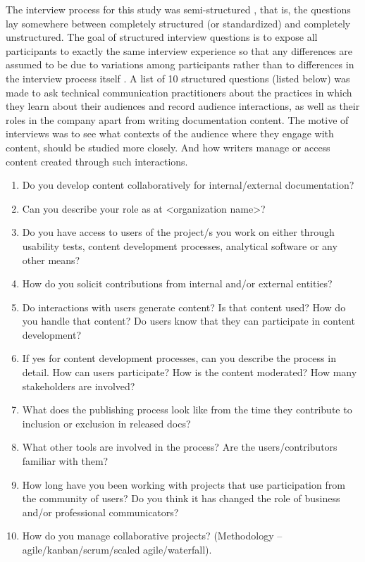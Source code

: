 The interview process for this study was semi-structured \cite{dicicco2006qualitative, knox2009qualitative, glaser2017discovery}, that is, the questions lay somewhere between completely structured (or standardized) and completely unstructured. The goal of structured interview questions is to expose all participants to exactly the same interview experience \cite{fontana2005interview} so that any differences are assumed to be due to variations among participants rather than to differences in the interview process itself \cite{fontana2005interview}. A list of 10 structured questions (listed below) was made to ask technical communication practitioners about the practices in which they learn about their audiences and record audience interactions, as well as their roles in the company apart from writing documentation content. The motive of interviews was to see what contexts of the audience where they engage with content, should be studied more closely. And how writers manage or access content created through such interactions.
\begin{enumerate}
  \item Do you develop content collaboratively for internal/external documentation?
  \item Can you describe your role as at <organization name>?
  \item Do you have access to users of the project/s you work on either through usability tests, content development processes, analytical software or any other means?
  \item How do you solicit contributions from internal and/or external entities?
  \item Do interactions with users generate content? Is that content used? How do you handle that content? Do users know that they can participate in content development?
  \item If yes for content development processes, can you describe the process in detail. How can users participate? How is the content moderated? How many stakeholders are involved?
  \item What does the publishing process look like from the time they contribute to inclusion or exclusion in released docs?
  \item What other tools are involved in the process? Are the users/contributors familiar with them?
  \item How long have you been working with projects that use participation from the community of users? Do you think it has changed the role of business and/or professional communicators?
  \item How do you manage collaborative projects? (Methodology – agile/kanban/scrum/scaled agile/waterfall).
\end{enumerate}

